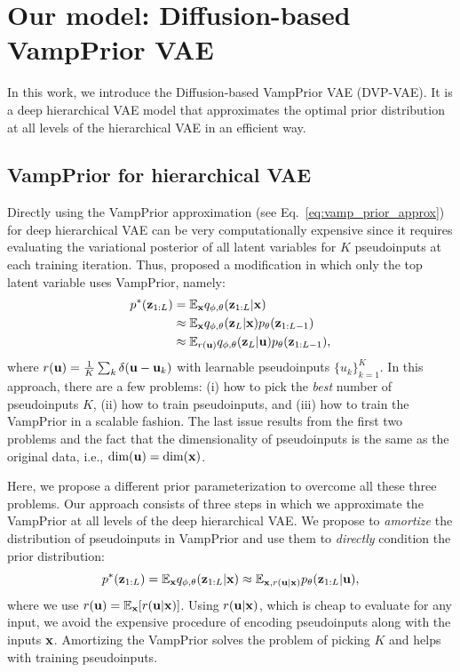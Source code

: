 
\section{Our model: Diffusion-based VampPrior VAE} \label{sec:proposed_approach}
In this work, we introduce the Diffusion-based VampPrior VAE (DVP-VAE). It is a deep hierarchical VAE model that approximates the optimal prior distribution at all levels of the hierarchical VAE in an efficient way.

\subsection{VampPrior for hierarchical VAE}
Directly using the VampPrior approximation (see Eq.~\ref{eq:vamp_prior_approx}) for deep hierarchical VAE can be very computationally expensive since it requires evaluating the variational posterior of all latent variables for $K$ pseudoinputs at each training iteration. Thus, \citep{tomczak2018vae} proposed a modification in which only the top latent variable uses VampPrior, namely:
\begin{equation}\label{eq:hierarchical_vamp}
\begin{aligned}
p^*(\rvz_{1:L}) &= \mathbb{E}_{\rvx} q_{\phi, \theta}(\rvz_{1:L}|\rvx) \\
&\approx \mathbb{E}_{\rvx} q_{\phi, \theta}(\rvz_{L}|\rvx) p_{\theta}(\rvz_{1:L-1})  \\
&\approx \mathbb{E}_{r(\rvu)} q_{\phi, \theta}(\rvz_{L}|\rvu) p_{\theta}(\rvz_{1:L-1}),
\end{aligned}
\end{equation}
where $r({\mathbf{u}}) = \frac1K \sum_k \delta({\mathbf{u}} - {\mathbf{u}}_k)$ with learnable pseudoinputs $\{u_k\}_{k=1}^K$.
In this approach, there are a few problems: (i) how to pick the \textit{best} number of pseudoinputs $K$, (ii) how to train pseudoinputs, and (iii) how to train the VampPrior in a scalable fashion. The last issue results from the first two problems and the fact that the dimensionality of pseudoinputs is the same as the original data, i.e., $\mathrm{dim}({\mathbf{u}}) = \mathrm{dim}({\mathbf{x}})$.

Here, we propose a different prior parameterization to overcome all these three problems. Our approach consists of three steps in which we approximate the VampPrior at all levels of the deep hierarchical VAE. 
We propose to \textit{amortize} the distribution of pseudoinputs in VampPrior and use them to \textit{directly} condition the prior distribution:
\begin{equation}\label{eq:our_vamp_prior}
p^*(\rvz_{1:L}) = \mathbb{E}_{\rvx} q_{\phi, \theta}(\rvz_{1:L}|\rvx) \approx \mathbb{E}_{\rvx, r(\rvu|\rvx)} p_{\theta}(\rvz_{1:L}|\rvu),
\end{equation}
where we use $r({\mathbf{u}}) = \mathbb{E}_{{\mathbf{x}}}[r({\mathbf{u}} | {\mathbf{x}})]$. Using $r({\mathbf{u}} | {\mathbf{x}})$, which is cheap to evaluate for any input, we avoid the expensive procedure of encoding pseudoinputs along with the inputs ${\mathbf{x}}$. Amortizing the VampPrior solves the problem of picking $K$ and helps with training pseudoinputs. 


